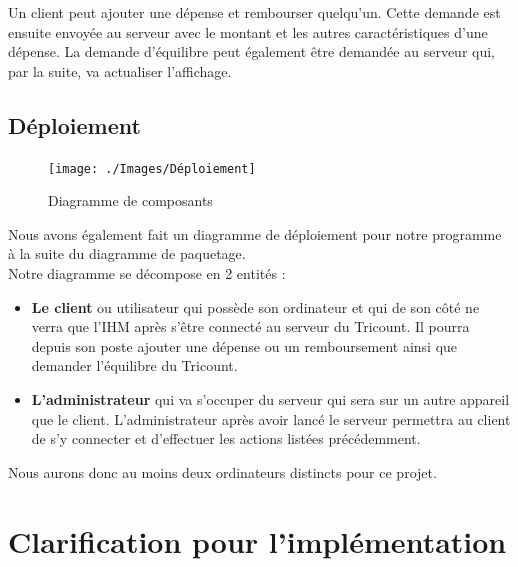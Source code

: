 \documentclass[12,french]{report}
\begin{document}
Un client peut ajouter une dépense et rembourser quelqu’un. Cette demande est ensuite envoyée au serveur avec le montant et les autres caractéristiques d’une dépense. 
La demande d’équilibre peut également être demandée au serveur qui, par la suite, va actualiser l’affichage. 

\section{Déploiement}

\begin{figure}[H]
	\center
	\texttt{[image: ./Images/Déploiement]}
	\caption{Diagramme de composants}
\end{figure}\vspace{0.2cm}

Nous avons également fait un diagramme de déploiement pour notre programme à la suite du diagramme de paquetage. \\

Notre diagramme se décompose en 2 entités : 
\begin{itemize}[label=\textbullet]
\item \textbf{Le client} ou utilisateur qui possède son ordinateur et qui de son côté ne verra que l’IHM après s’être connecté au serveur du Tricount. Il pourra depuis son poste ajouter une dépense ou un remboursement ainsi que demander l’équilibre du Tricount.\\
\item \textbf{L’administrateur} qui va s’occuper du serveur qui sera sur un autre appareil que le client. L’administrateur après avoir lancé le serveur permettra au client de s’y connecter et d’effectuer les actions listées précédemment. 

\end{itemize}\vspace{0.2cm}

Nous aurons donc au moins deux ordinateurs distincts pour ce projet.

\chapter{Clarification pour l'implémentation}
\end{document}
